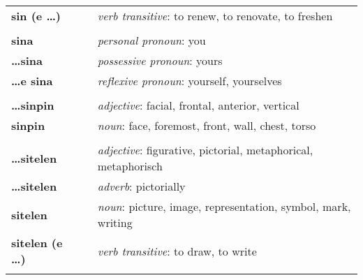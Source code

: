 \begin{supertabular}{p{2,5cm}|ll}
    \textbf{sin (e \dots)}       &  & \textit{verb transitive}: to renew, to renovate, to freshen                                                \\
                                 &  &                                                                                                            \\
    \textbf{sina}                &  & \textit{personal pronoun}: you                                                                             \\
    \textbf{\dots sina}          &  & \textit{possessive pronoun}: yours                                                                         \\
    \textbf{\dots e sina}        &  & \textit{reflexive pronoun}: yourself, yourselves                                                           \\
                                 &  &                                                                                                            \\
    \textbf{\dots sinpin}        &  & \textit{adjective}: facial, frontal, anterior, vertical                                                    \\
    \textbf{sinpin}              &  & \textit{noun}: face, foremost, front, wall, chest, torso                                                   \\
                                 &  &                                                                                                            \\
    \textbf{\dots sitelen}       &  & \textit{adjective}: figurative, pictorial, metaphorical, metaphorisch                                      \\
    \textbf{\dots sitelen}       &  & \textit{adverb}: pictorially                                                                               \\
    \textbf{sitelen}             &  & \textit{noun}: picture, image, representation, symbol, mark, writing                                       \\
    \textbf{sitelen (e \dots)}   &  & \textit{verb transitive}: to draw, to write                                                                \\
                                 &  &                                                                                                            \\

\end{supertabular}
